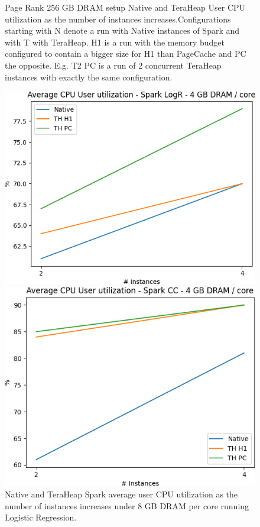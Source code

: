 \begin{figure}[thbp]
    \caption{Page Rank 256 GB DRAM setup Native and TeraHeap
    User CPU utilization as the number of instances increases.Configurations
    starting with N denote a run with Native instances of Spark and
    with T with TeraHeap. H1 is a run with the memory budget
    configured to contain a bigger size for H1 than PageCache and PC
    the opposite. E.g. T2 PC is a run of 2 concurrent TeraHeap
    instances with exactly the same configuration. }
                \label{fig:pr_256_usr}
		\fi
        \centering
   \includegraphics[width=\linewidth]{./fig/LOGR_64_USR.png}
    \caption{Native and TeraHeap Spark average user CPU utilization
        as the number of instances increases under 8 GB DRAM per core running Logistic Regression.}
           \label{fig:logr_64_usr}
	\includegraphics[width=\linewidth]{./fig/CC_64_USR.png}

\end{figure}
